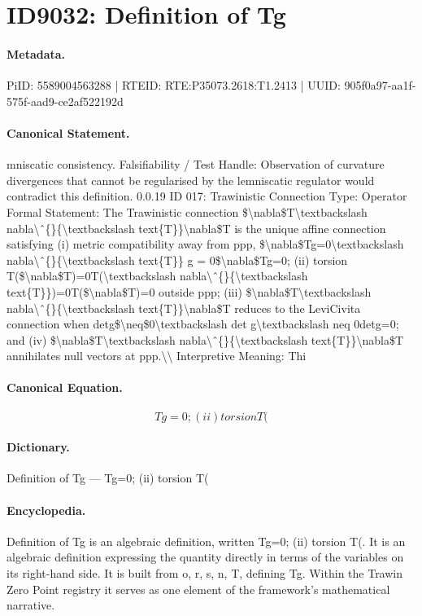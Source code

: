 \section*{ID9032: Definition of Tg}
\paragraph{Metadata.}
PiID: 5589004563288 | RTEID: RTE:P35073.2618:T1.2413 | UUID: 905f0a97-aa1f-575f-aad9-ce2af522192d

\paragraph{Canonical Statement.}
mniscatic consistency. Falsifiability / Test Handle: Observation of curvature divergences that cannot be regularised by the lemniscatic regulator would contradict this definition. 0.0.19 ID 017: Trawinistic Connection Type: Operator Formal Statement: The Trawinistic connection \$\textbackslash{}nabla\$T\textbackslash{}textbackslash nabla\textbackslash{}ˆ\{\}\{\textbackslash{}textbackslash text\{T\}\}\textbackslash{}nabla\$T is the unique affine connection satisfying (i) metric compatibility away from ppp, \$\textbackslash{}nabla\$Tg=0\textbackslash{}textbackslash nabla\textbackslash{}ˆ\{\}\{\textbackslash{}textbackslash text\{T\}\} g = 0\$\textbackslash{}nabla\$Tg=0; (ii) torsion T(\$\textbackslash{}nabla\$T)=0T(\textbackslash{}textbackslash nabla\textbackslash{}ˆ\{\}\{\textbackslash{}textbackslash text\{T\}\})=0T(\$\textbackslash{}nabla\$T)=0 outside ppp; (iii) \$\textbackslash{}nabla\$T\textbackslash{}textbackslash nabla\textbackslash{}ˆ\{\}\{\textbackslash{}textbackslash text\{T\}\}\textbackslash{}nabla\$T reduces to the LeviCivita connection when detg\$\textbackslash{}neq\$0\textbackslash{}textbackslash det g\textbackslash{}textbackslash neq 0detg=0; and (iv) \$\textbackslash{}nabla\$T\textbackslash{}textbackslash nabla\textbackslash{}ˆ\{\}\{\textbackslash{}textbackslash text\{T\}\}\textbackslash{}nabla\$T annihilates null vectors at ppp.\textbackslash{}\textbackslash{} Interpretive Meaning: Thi

\paragraph{Canonical Equation.}
\[
Tg=0; (ii) torsion T(
\]

\paragraph{Dictionary.}
Definition of Tg — Tg=0; (ii) torsion T(

\paragraph{Encyclopedia.}
Definition of Tg is an algebraic definition, written Tg=0; (ii) torsion T(. It is an algebraic definition expressing the quantity directly in terms of the variables on its right-hand side. It is built from o, r, s, n, T, defining Tg. Within the Trawin Zero Point registry it serves as one element of the framework's mathematical narrative.
